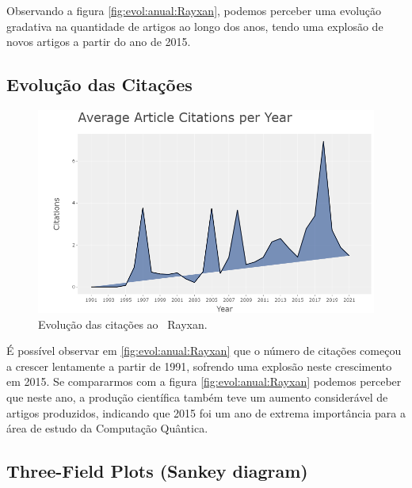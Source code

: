 Observando a figura \ref{fig:evol:anual:Rayxan}, podemos perceber uma evolução gradativa na quantidade de artigos ao longo dos anos, tendo uma explosão de novos artigos a partir do ano de 2015.

\subsection{Evolução das Citações}

\begin{figure}
    \centering
    \includegraphics[width=1\textwidth]{experiments/Rayxan/PesqBibliogr/ComputacaoQuantica/WoS-20220206/AverageCitations.png}
    \caption{Evolução das citações ao \dataset\   Rayxan.}
    \label{fig:cit:anual:Rayxan}
\end{figure}

É possível observar em \ref{fig:evol:anual:Rayxan} que o número de citações começou a crescer lentamente a partir de 1991, sofrendo uma explosão neste crescimento em 2015. Se compararmos com a figura \ref{fig:evol:anual:Rayxan} podemos perceber que neste ano, a produção científica também teve um aumento considerável de artigos produzidos, indicando que 2015 foi um ano de extrema importância para a área de estudo da Computação Quântica.

\subsection{Three-Field Plots (Sankey diagram)}

